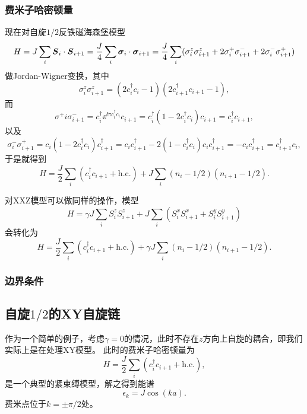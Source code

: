 \subsubsection{费米子哈密顿量}

现在对自旋$1/2$反铁磁海森堡模型
\begin{equation}
    H = J \sum_i \vb*{S}_i \cdot \vb*{S}_{i+1} = \frac{J}{4} \sum_i \vb*{\sigma}_i \cdot \vb*{\sigma}_{i+1} = \frac{J}{4} \sum_i (\sigma^z_{i} \sigma^z_{i+1} + 2 \sigma^+_i \sigma^-_{i+1} + 2 \sigma^-_i \sigma^+_{i+1})
\end{equation}
做Jordan-Wigner变换，其中
\[
    \sigma^z_i \sigma^z_{i+1} = (2 c^\dagger_i c_i - 1) (2 c^\dagger_{i+1} c_{i+1} - 1),
\]
而
\[
    \sigma^+{i} \sigma^-_{i+1} = c^\dagger_i \ee^{\ii \pi c^\dagger_i c_i} c_{i+1} = c^\dagger_i (1 - 2 c^\dagger_i c_i) c_{i+1} = c^\dagger_i c_{i+1},
\]
以及
\[
    \sigma^-_i \sigma^+_{i+1} = c_i (1 - 2 c^\dagger_i c_i) c^\dagger_{i+1} = c_i c_{i+1}^\dagger - 2 (1 - c_i^\dagger c_i) c_i c_{i+1}^\dagger = - c_i c_{i+1}^\dagger = c_{i+1}^\dagger c_i,
\]
于是就得到
\begin{equation}
    H = \frac{J}{2} \sum_i (c_i^\dagger c_{i+1} + \text{h.c.}) + J \sum_{i} (n_i - 1/2) (n_{i+1} - 1/2).
\end{equation}

对XXZ模型可以做同样的操作，模型
\begin{equation}
    H = \gamma J \sum_{i} S^z_{i} S^z_{i+1} + J \sum_{i} (S^x_{i} S^x_{i+1} + S^y_i S^y_{i+1})
\end{equation}
会转化为
\begin{equation}
    H = \frac{J}{2} \sum_i (c_i^\dagger c_{i+1} + \text{h.c.}) + \gamma J \sum_{i} (n_i - 1/2) (n_{i+1} - 1/2).
\end{equation}

\subsubsection{边界条件}


\subsection{自旋$1/2$的XY自旋链}

作为一个简单的例子，考虑$\gamma = 0$的情况，此时不存在$z$方向上自旋的耦合，即我们实际上是在处理XY模型。
此时的费米子哈密顿量为
\begin{equation}
    H = \frac{J}{2} \sum_i (c_i^\dagger c_{i+1} + \text{h.c.}) ,
\end{equation}
是一个典型的紧束缚模型，解之得到能谱
\begin{equation}
    \epsilon_k = J \cos (ka).
\end{equation}
费米点位于$k = \pm \pi / 2$处。

